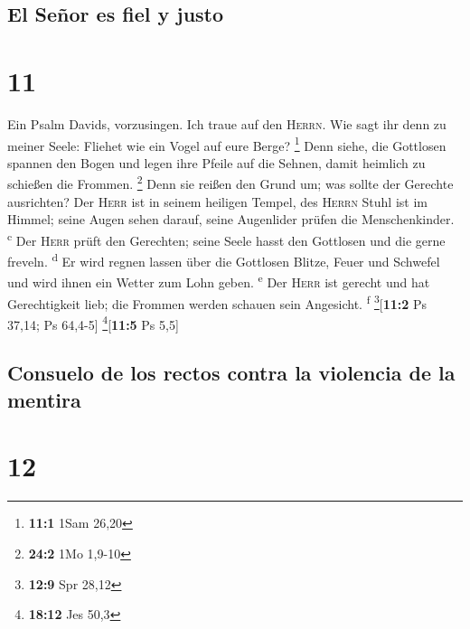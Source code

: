 \hypertarget{el-seuxf1or-es-fiel-y-justo}{%
\subsection{El Señor es fiel y
justo}\label{el-seuxf1or-es-fiel-y-justo}}

\hypertarget{section-10}{%
\section{11}\label{section-10}}

 Ein Psalm Davids, vorzusingen. Ich traue auf den
\textsc{Herrn}. Wie sagt ihr denn zu meiner Seele: Fliehet wie ein Vogel
auf eure Berge? \footnote{\textbf{11:1} 1Sam 26,20}  Denn
siehe, die Gottlosen spannen den Bogen und legen ihre Pfeile auf die
Sehnen, damit heimlich zu schießen die Frommen. \footnote{\textbf{24:2}
  1Mo 1,9-10}  Denn sie reißen den Grund um; was sollte
der Gerechte ausrichten?  Der \textsc{Herr} ist in seinem
heiligen Tempel, des \textsc{Herrn} Stuhl ist im Himmel; seine Augen
sehen darauf, seine Augenlider prüfen die Menschenkinder.
\textsuperscript{c}  Der \textsc{Herr} prüft den
Gerechten; seine Seele hasst den Gottlosen und die gerne freveln.
\textsuperscript{d}  Er wird regnen lassen über die
Gottlosen Blitze, Feuer und Schwefel und wird ihnen ein Wetter zum Lohn
geben. \textsuperscript{e}  Der \textsc{Herr} ist gerecht
und hat Gerechtigkeit lieb; die Frommen werden schauen sein Angesicht.
\textsuperscript{f} \footnote{\textbf{12:9} Spr 28,12}{[}\textbf{11:2}
Ps 37,14; Ps 64,4-5{]} \footnote{\textbf{18:12} Jes 50,3}{[}\textbf{11:5}
Ps 5,5{]}

\hypertarget{consuelo-de-los-rectos-contra-la-violencia-de-la-mentira}{%
\subsection{Consuelo de los rectos contra la violencia de la
mentira}\label{consuelo-de-los-rectos-contra-la-violencia-de-la-mentira}}

\hypertarget{section-11}{%
\section{12}\label{section-11}}

